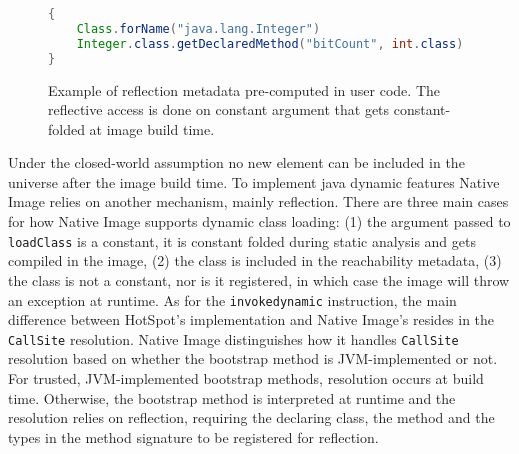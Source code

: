 \begin{figure}[ht]
    \centering
\begin{lstlisting}[language=Java]
{
    Class.forName("java.lang.Integer")
    Integer.class.getDeclaredMethod("bitCount", int.class)
}    
\end{lstlisting}
    \caption{Example of reflection metadata pre-computed in user code. The reflective access is done on constant argument that gets constant-folded at image build time.}
    \label{fig:computing_reflection_metadata_in_code_code}
\end{figure}

Under the closed-world assumption no new element can be included in the universe after the image build time. To implement java dynamic features Native Image relies on another mechanism, mainly reflection. 
There are three main cases for how Native Image supports dynamic class loading: (1) the argument passed to \verb|loadClass| is a constant, it is constant folded during static analysis and gets compiled in the image, (2) the class is included in the reachability metadata, (3) the class is not a constant, nor is it registered, in which case the image will throw an exception at runtime.
As for the \verb|invokedynamic| instruction, the main difference between HotSpot's implementation and Native Image's resides in the \verb|CallSite| resolution. Native Image distinguishes how it handles \verb|CallSite| resolution based on whether the bootstrap method is JVM-implemented or not. For trusted, JVM-implemented bootstrap methods, resolution occurs at build time. Otherwise, the bootstrap method is interpreted at runtime and the resolution relies on reflection, requiring the declaring class, the method and the types in the method signature to be registered for reflection.